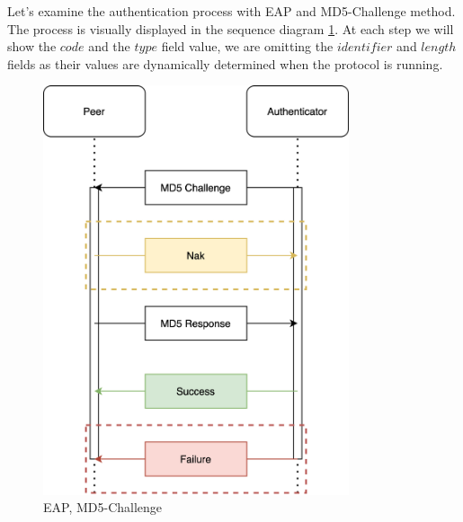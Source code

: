 \bigskip
\noindent
Let's examine the authentication process with EAP and MD5-Challenge method. 
The process is visually displayed in the sequence diagram \ref{fig:eap-md5}.
At each step we will show the $code$ and the $type$ field value, we are omitting the $identifier$ and $length$ fields as their values are dynamically determined when the protocol is running.

\begin{figure}[h]
	\centering
	\includegraphics[width=9cm]{images/eap-md5}
	\caption{EAP, MD5-Challenge}
	\label{fig:eap-md5}
\end{figure}

